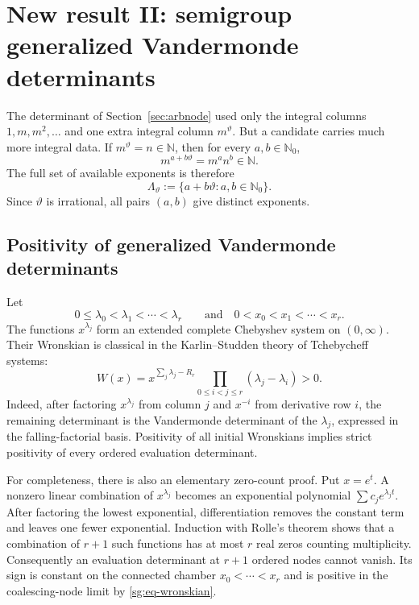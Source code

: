 \documentclass[11pt,oneside]{article}
\theoremstyle{definition}
\theoremstyle{remark}
\newcommand{\N}{\mathbb N}
\newcommand{\Nzero}{\mathbb N_0}
\newcommand{\thetaq}{\vartheta}
\newcommand{\LambdaTheta}{\Lambda_{\thetaq}}
\begin{document}
\section{New result II: semigroup generalized Vandermonde determinants}
\label{sec:semigroup}

The determinant of Section~\ref{sec:arbnode} used only the integral columns
$1,m,m^2,\ldots$ and one extra integral column $m^{\thetaq}$.  But a candidate carries much
more integral data.  If $m^{\thetaq}=n\in\N$, then for every $a,b\in\Nzero$,
\begin{equation}
 m^{a+b\thetaq}=m^a n^b\in\N.
 \label{sg:eq-mixed-integrality}
\end{equation}
The full set of available exponents is therefore
\[
 \LambdaTheta:=\{a+b\thetaq:a,b\in\Nzero\}.
\]
Since $\thetaq$ is irrational, all pairs $(a,b)$ give distinct exponents.

\subsection{Positivity of generalized Vandermonde determinants}

Let
\[
 0\le\lambda_0<\lambda_1<\cdots<\lambda_r
\qquad\text{and}\quad
 0<x_0<x_1<\cdots<x_r.
\]
The functions $x^{\lambda_j}$ form an extended complete Chebyshev system on $(0,\infty)$.
Their Wronskian is classical in the Karlin--Studden theory of Tchebycheff systems:
\begin{equation}
 W(x)
 =x^{\sum_j\lambda_j-R_r}
   \prod_{0\le i<j\le r}(\lambda_j-\lambda_i)>0.
 \label{sg:eq-wronskian}
\end{equation}
Indeed, after factoring $x^{\lambda_j}$ from column $j$ and $x^{-i}$ from derivative row
$i$, the remaining determinant is the Vandermonde determinant of the $\lambda_j$, expressed
in the falling-factorial basis.  Positivity of all initial Wronskians implies strict positivity
of every ordered evaluation determinant.

For completeness, there is also an elementary zero-count proof.  Put $x=e^t$.  A nonzero
linear combination of $x^{\lambda_j}$ becomes an exponential polynomial
$\sum c_je^{\lambda_jt}$.  After factoring the lowest exponential, differentiation removes
the constant term and leaves one fewer exponential.  Induction with Rolle's theorem shows
that a combination of $r+1$ such functions has at most $r$ real zeros counting multiplicity.
Consequently an evaluation determinant at $r+1$ ordered nodes cannot vanish.  Its sign is
constant on the connected chamber $x_0<\cdots<x_r$ and is positive in the coalescing-node
limit by \eqref{sg:eq-wronskian}.
\end{document}
